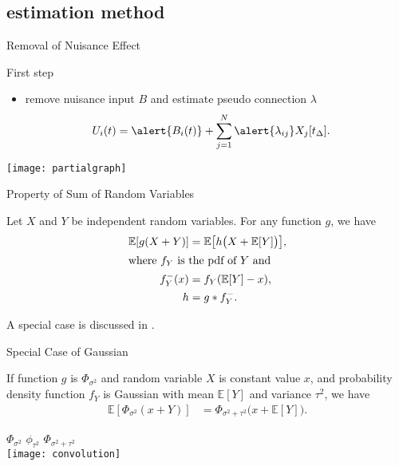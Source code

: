 \documentclass[fleqn,aspectratio=1610]{beamer}
\begin{document}
\subsection{estimation method}
\label{sec:orge92ec09}
\begin{frame}[label={sec:org411550e}]{Removal of Nuisance Effect}
\begin{block}{First step}
\begin{itemize}
\item remove nuisance input \(B\) and estimate pseudo connection \(\lambda\)
\begin{align}
  U_i(t)
  &= \alert{B_i(t)} +
    \sum_{j=1}^{N} \alert{\lambda_{ij}} X_j[t_\Delta].
\end{align}
\end{itemize}
\end{block}
\begin{center}
\texttt{[image: partialgraph]}
\end{center}
\end{frame}

\begin{frame}[label={sec:org50c4f3d}]{Property of Sum of Random Variables}
\begin{theorem}[]\label{sec:orgc36a9a1}
Let \(X\) and \(Y\) be independent random variables.
For any function \(g\), we have
\begin{align}
  \mathbb{E}[g(X+Y)]
  &= \mathbb{E}\bigl[h\bigl(X+\mathbb{E}[Y]\bigr)\bigr],\\
  \intertext{where \(f_{Y}\) is the pdf of \(Y\) and}
  f^{-}_{Y}(x) &= f_Y(\mathbb{E}[Y]-x),\\
  h &= g*f^{-}_{Y}.
\end{align}
\end{theorem}
A special case is discussed in \cite{Hyvaerinen2002}.
\end{frame}

\begin{frame}[label={sec:org305d9b5}]{Special Case of Gaussian}
\begin{corollary}[]\label{sec:org305ae38}
If function \(g\) is \(\Phi_{\sigma^{2}}\)
and random variable \(X\) is constant value \(x\),
and probability density function \(f_Y\) is Gaussian
with mean \(\mathbb{E}[Y]\) and variance \(\tau^{2}\), we have
\begin{align}
  \mathbb{E}[\Phi_{\sigma^{2}}(x+Y)]
  &=\Phi_{\sigma^{2}+\tau^{2}}\bigl(x+\mathbb{E}[Y]\bigr).
\end{align}
\end{corollary}
\begin{center}
\(\Phi_{\sigma^{2}}\)\hspace{.29\linewidth}
\(\phi_{\tau^{2}}\)\hspace{.24\linewidth}
\(\Phi_{\sigma^{2}\!+\!\tau^{2}}\)\\[0pt]
\texttt{[image: convolution]}    
\end{center}
\end{frame}
\end{document}
